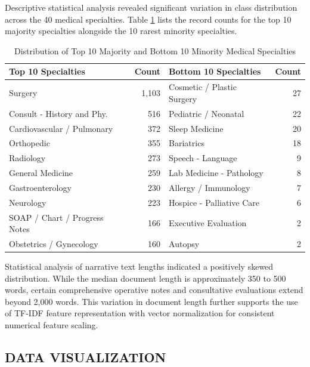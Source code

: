 Descriptive statistical analysis revealed significant variation in class distribution across the 40 medical specialties. Table \ref{tab:top_bottom_specialties} lists the record counts for the top 10 majority specialties alongside the 10 rarest minority specialties.

\begin{table}[H]
\centering
\small
\setlength{\tabcolsep}{5pt}
\begin{tabularx}{\linewidth}{|>{\raggedright\arraybackslash}X|r|>{\raggedright\arraybackslash}X|r|}
\hline
\textbf{Top 10 Specialties} & \textbf{Count} & \textbf{Bottom 10 Specialties} & \textbf{Count} \\
\hline
Surgery & 1,103 & Cosmetic / Plastic Surgery & 27 \\
\hline
Consult - History and Phy. & 516 & Pediatric / Neonatal & 22 \\
\hline
Cardiovascular / Pulmonary & 372 & Sleep Medicine & 20 \\
\hline
Orthopedic & 355 & Bariatrics & 18 \\
\hline
Radiology & 273 & Speech - Language & 9 \\
\hline
General Medicine & 259 & Lab Medicine - Pathology & 8 \\
\hline
Gastroenterology & 230 & Allergy / Immunology & 7 \\
\hline
Neurology & 223 & Hospice - Palliative Care & 6 \\
\hline
SOAP / Chart / Progress Notes & 166 & Executive Evaluation & 2 \\
\hline
Obstetrics / Gynecology & 160 & Autopsy & 2 \\
\hline
\end{tabularx}
\caption{Distribution of Top 10 Majority and Bottom 10 Minority Medical Specialties}
\label{tab:top_bottom_specialties}
\end{table}

Statistical analysis of narrative text lengths indicated a positively skewed distribution. While the median document length is approximately 350 to 500 words, certain comprehensive operative notes and consultative evaluations extend beyond 2,000 words. This variation in document length further supports the use of TF-IDF feature representation with vector normalization for consistent numerical feature scaling.

\clearpage

\subsection{DATA VISUALIZATION}

